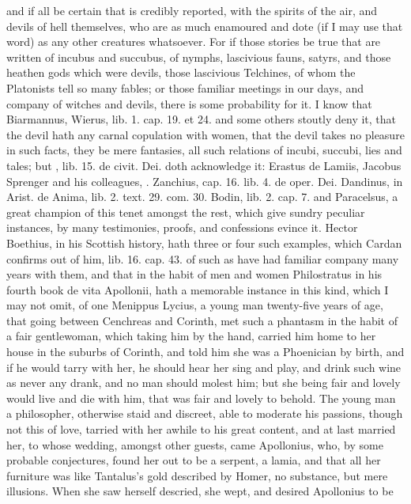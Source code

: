 and if all be certain that is credibly reported, with the spirits of
the air, and devils of hell themselves, who are as much enamoured and
dote (if I may use that word) as any other creatures whatsoever. For if
those stories be true that are written of incubus and succubus, of
nymphs, lascivious fauns, satyrs, and those heathen gods which were
devils, those lascivious Telchines, of whom the Platonists tell so many
fables; or those familiar meetings in our days, and company of witches
and devils, there is some probability for it. I know that Biarmannus,
Wierus, lib. 1. cap. 19. et 24. and some others stoutly deny it, that
the devil hath any carnal copulation with women, that the devil takes
no pleasure in such facts, they be mere fantasies, all such relations
of incubi, succubi, lies and tales; but \Austin{}, lib. 15. de civit. Dei.
doth acknowledge it: Erastus de Lamiis, Jacobus Sprenger and his
colleagues, \etc{}.  Zanchius, cap. 16. lib. 4. de oper. Dei.
Dandinus, in Arist. de Anima, lib. 2. text. 29. com. 30. Bodin, lib. 2.
cap. 7. and Paracelsus, a great champion of this tenet amongst the
rest, which give sundry peculiar instances, by many testimonies,
proofs, and confessions evince it. Hector Boethius, in his Scottish
history, hath three or four such examples, which Cardan confirms out of
him, lib. 16. cap. 43. of such as have had familiar company many years
with them, and that in the habit of men and women Philostratus in his
fourth book de vita Apollonii, hath a memorable instance in this kind,
which I may not omit, of one Menippus Lycius, a young man twenty-five
years of age, that going between Cenchreas and Corinth, met such a
phantasm in the habit of a fair gentlewoman, which taking him by the
hand, carried him home to her house in the suburbs of Corinth, and told
him she was a Phoenician by birth, and if he would tarry with her,
he should hear her sing and play, and drink such wine as never
any drank, and no man should molest him; but she being fair and lovely
would live and die with him, that was fair and lovely to behold. The
young man a philosopher, otherwise staid and discreet, able to moderate
his passions, though not this of love, tarried with her awhile to his
great content, and at last married her, to whose wedding, amongst other
guests, came Apollonius, who, by some probable conjectures, found her
out to be a serpent, a lamia, and that all her furniture was like
Tantalus's gold described by Homer, no substance, but mere illusions.
When she saw herself descried, she wept, and desired Apollonius to be
